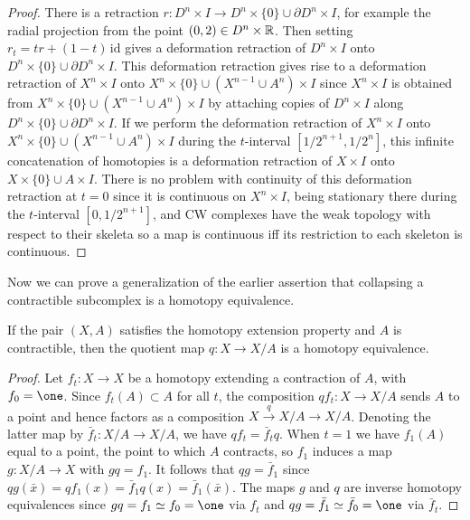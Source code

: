 \begin{proof}
There is a retraction $r : D^n \times I \to D^n \times \{0\} \cup \partial D^n \times I$, for example the
radial projection from the point $(0,2) \in D^n \times \mathbb{R}$. Then setting
$r_t = tr + (1-t)\,\mathrm{id}$ gives a deformation retraction of $D^n \times I$ onto
$D^n \times \{0\} \cup \partial D^n \times I$. This deformation retraction gives rise to a deformation
retraction of $X^n \times I$ onto $X^n \times \{0\} \cup (X^{n-1} \cup A^n) \times I$ since
$X^n \times I$ is obtained from $X^n \times \{0\} \cup (X^{n-1} \cup A^n) \times I$ by attaching copies
of $D^n \times I$ along $D^n \times \{0\} \cup \partial D^n \times I$. If we perform the deformation
retraction of $X^n \times I$ onto $X^n \times \{0\} \cup (X^{n-1} \cup A^n) \times I$ during the
$t$-interval $[1/2^{n+1}, 1/2^n]$, this infinite concatenation of homotopies is a
deformation retraction of $X \times I$ onto $X \times \{0\} \cup A \times I$. There is no problem
with continuity of this deformation retraction at $t = 0$ since it is continuous on
$X^n \times I$, being stationary there during the $t$-interval $[0, 1/2^{n+1}]$, and CW
complexes have the weak topology with respect to their skeleta so a map is continuous
iff its restriction to each skeleton is continuous.
\end{proof}



Now we can prove a generalization of the earlier assertion that collapsing a
contractible subcomplex is a homotopy equivalence.

\begin{proposition}
\label{prop:quotient-by-contractible-hep-homotopy-equiv}
\leanok
{}
If the pair $(X,A)$ satisfies the homotopy extension property and $A$ is
contractible, then the quotient map $q : X \to X/A$ is a homotopy equivalence.
\end{proposition}

\begin{proof}
\leanok
Let $f_t : X \to X$ be a homotopy extending a contraction of $A$, with $f_0 = \one$.
Since $f_t(A) \subset A$ for all $t$, the composition $qf_t : X \to X/A$ sends $A$ to a point
and hence factors as a composition $X \xrightarrow{q} X/A \to X/A$. Denoting the latter
map by $\bar f_t : X/A \to X/A$, we have $qf_t = \bar f_t q$. When $t=1$ we have $f_1(A)$
equal to a point, the point to which $A$ contracts, so $f_1$ induces a map $g : X/A \to X$
with $gq = f_1$. It follows that $qg = \bar f_1$ since
$qg(\bar x) = q f_1(x) = \bar f_1 q(x) = \bar f_1(\bar x)$. The maps $g$ and $q$ are inverse
homotopy equivalences since $gq = f_1 \simeq f_0 = \one$ via $f_t$ and
$qg = \bar f_1 \simeq \bar f_0 = \one$ via $\bar f_t$.
\end{proof}

